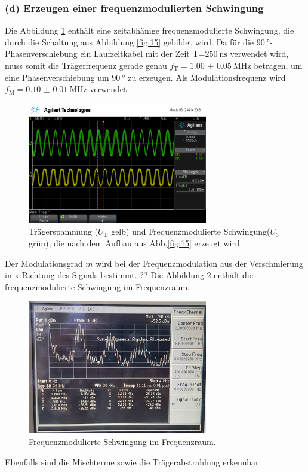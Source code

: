 \subsubsection{(d) Erzeugen einer frequenzmodulierten Schwingung}
\label{subsubsec:auswertung_d}
Die Abbildung \ref{fig:freq_zeit} enthält eine zeitabhänige frequenzmodulierte
Schwingung, die durch die Schaltung aus Abbildung \ref{fig:15}
gebildet wird.
Da für die  $\SI{90}{\degree}$-Phasenverschiebung ein Laufzeitkabel mit der
Zeit T=$\SI{250}{\nano\second}$ verwendet wird, muss somit die
Trägerfrequenz gerade genau $f_{\text{T}}=\SI{1.00(5)}{\mega\hertz}$
betragen, um eine Phasenverschiebung um $\SI{90}{\degree}$
zu erzeugen. Als Modulationsfrequenz wird
$f_{\text{M}}=\SI{0.10(1)}{\mega\hertz}$ verwendet.

\begin{figure}
  \centering
  \includegraphics[width=0.7\textwidth]{osci/freq_mod.png}
  \caption{Trägerspammung ($U_{\text{T}}$ gelb) und Frequenzmodulierte
  Schwingung($U_3$ grün), die nach dem Aufbau aus Abb.\ref{fig:15} erzeugt wird.}
  \label{fig:freq_zeit}
\end{figure}
Der Modulationsgrad $m$ wird bei der Frequenzmodulation
aus der Verschmierung in x-Richtung des Signals bestimmt.
??
Die Abbildung \ref{fig:frequenz_freq} enthält die frequenzmodulierte Schwingung
im Frequenzraum.
\begin{figure}
  \centering
  \includegraphics[width=0.7\textwidth]{spec/frequenzmodulation_bereich_fresh_cool.jpg}
  \caption{Frequenzmodulierte
Schwingung im Frequenzraum.}
\label{fig:frequenz_freq}
\end{figure}
Ebenfalls sind die Mischterme sowie die Trägerabstrahlung erkennbar.



